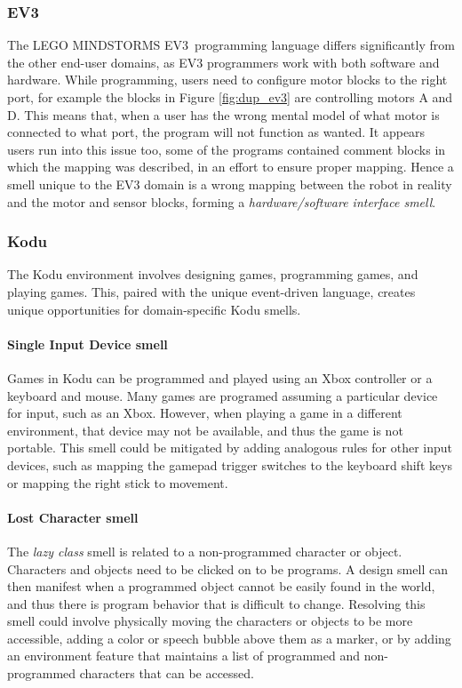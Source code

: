 \documentclass[conference]{IEEEtran}
\newcommand{\ms}{LEGO MINDSTORMS EV3}
\begin{document}
\subsubsection{EV3}
The \ms~programming language differs significantly from the other end-user domains, as EV3 programmers work with both software and hardware. While programming, users need to configure motor blocks to the right port, for example the blocks in Figure \ref{fig:dup_ev3} are controlling motors A and D. This means that, when a user has the wrong mental model of what motor is connected to what port, the program will not function as wanted. It appears users run into this issue too, some of the programs contained comment blocks in which the mapping was described, in an effort to ensure proper mapping. Hence a smell unique to the EV3 domain is a wrong mapping between the robot in reality and the motor and sensor blocks, forming a \emph{hardware/software interface smell}. 

\subsubsection{Kodu}
The Kodu environment involves designing games, programming games, and playing games. This, paired with the unique event-driven language, creates unique opportunities for domain-specific Kodu smells. 

% 



\paragraph{Single Input Device smell}
Games in Kodu can be programmed and played using an Xbox controller or a keyboard and mouse. Many games are programed assuming a particular device for input, such as an Xbox. However, when playing a game in a different environment, that device may not be available, and thus the game is not portable. This smell could be mitigated by adding analogous rules for other input devices, such as mapping the gamepad trigger switches to the keyboard shift keys or mapping the right stick to movement. 

\paragraph{Lost Character smell}
The \emph{lazy class} smell is related to a non-programmed character or object. Characters and objects need to be clicked on to be programs. A design smell can then manifest when a programmed object cannot be easily found in the world, and thus there is program behavior that is difficult to change. Resolving this smell could involve physically moving the characters or objects to be more accessible, adding a color or speech bubble above them as a marker, or by adding an environment feature that maintains a list of programmed and non-programmed characters that can be accessed. 	
\end{document}
